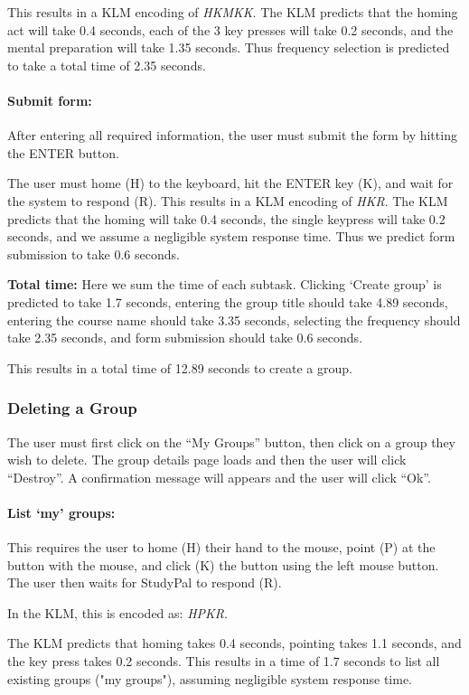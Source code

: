 \documentclass[conference]{IEEEtran}
\begin{document}
This results in a KLM encoding of \emph{HKMKK}.
The KLM predicts that the homing act will take 0.4 seconds, each of the 3 key presses will take 0.2 seconds, and the mental preparation will take 1.35 seconds.
Thus frequency selection is predicted to take a total time of 2.35 seconds.

\paragraph{Submit form:}
After entering all required information, the user must submit the form by hitting the ENTER button.

The user must home (H) to the keyboard, hit the ENTER key (K), and wait for the system to respond (R).
This results in a KLM encoding of \emph{HKR}.
The KLM predicts that the homing will take 0.4 seconds, the single keypress will take 0.2 seconds, and we assume a negligible system response time.
Thus we predict form submission to take 0.6 seconds.

\textbf{Total time:}
Here we sum the time of each subtask.
Clicking `Create group' is predicted to take 1.7 seconds,
entering the group title should take 4.89 seconds,
entering the course name should take 3.35 seconds,
selecting the frequency should take 2.35 seconds,
and form submission should take 0.6 seconds.

This results in a total time of 12.89 seconds to create a group.


\subsubsection{Deleting a Group}
The user must first click on the ``My Groups'' button, then click on a group they wish to delete.  The group details page loads and then the user will click ``Destroy''.  A confirmation message will appears and the user will click ``Ok''.

\paragraph{List `my' groups:}
This requires the user to home (H) their hand to the mouse, point (P) at the button with the mouse, and click (K) the button using the left mouse button.
The user then waits for StudyPal to respond (R).

In the KLM, this is encoded as: \emph{HPKR}.

The KLM predicts that homing takes 0.4 seconds, pointing takes 1.1 seconds, and the key press takes 0.2 seconds.
This results in a time of 1.7 seconds to list all existing groups ("my groups"), assuming negligible system response time.
\end{document}

